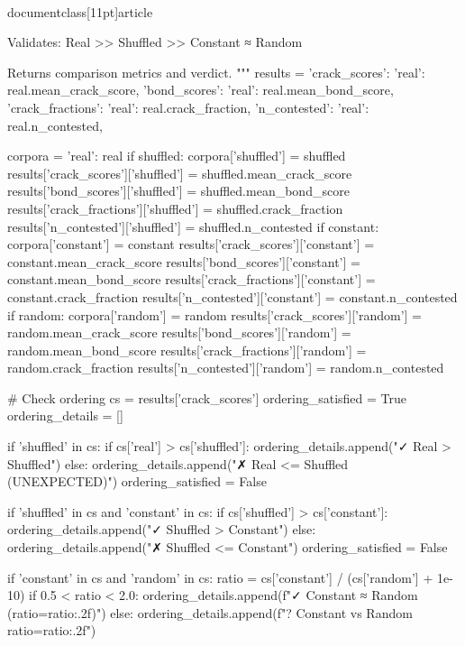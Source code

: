 \\documentclass[11pt]{article}
\begin{document}
\begin{CodeBlock}
{{{{{{{{{{    Validates: Real >> Shuffled >> Constant ≈ Random
    
    Returns comparison metrics and verdict.
    """
    results = {
        'crack_scores': {'real': real.mean_crack_score},
        'bond_scores': {'real': real.mean_bond_score},
        'crack_fractions': {'real': real.crack_fraction},
        'n_contested': {'real': real.n_contested},
    }
    
    corpora = {'real': real}
    if shuffled:
        corpora['shuffled'] = shuffled
        results['crack_scores']['shuffled'] = shuffled.mean_crack_score
        results['bond_scores']['shuffled'] = shuffled.mean_bond_score
        results['crack_fractions']['shuffled'] = shuffled.crack_fraction
        results['n_contested']['shuffled'] = shuffled.n_contested
    if constant:
        corpora['constant'] = constant
        results['crack_scores']['constant'] = constant.mean_crack_score
        results['bond_scores']['constant'] = constant.mean_bond_score
        results['crack_fractions']['constant'] = constant.crack_fraction
        results['n_contested']['constant'] = constant.n_contested
    if random:
        corpora['random'] = random
        results['crack_scores']['random'] = random.mean_crack_score
        results['bond_scores']['random'] = random.mean_bond_score
        results['crack_fractions']['random'] = random.crack_fraction
        results['n_contested']['random'] = random.n_contested
    
    # Check ordering
    cs = results['crack_scores']
    ordering_satisfied = True
    ordering_details = []
    
    if 'shuffled' in cs:
        if cs['real'] > cs['shuffled']:
            ordering_details.append("✓ Real > Shuffled")
        else:
            ordering_details.append("✗ Real <= Shuffled (UNEXPECTED)")
            ordering_satisfied = False
    
    if 'shuffled' in cs and 'constant' in cs:
        if cs['shuffled'] > cs['constant']:
            ordering_details.append("✓ Shuffled > Constant")
        else:
            ordering_details.append("✗ Shuffled <= Constant")
            ordering_satisfied = False
    
    if 'constant' in cs and 'random' in cs:
        ratio = cs['constant'] / (cs['random'] + 1e-10)
        if 0.5 < ratio < 2.0:
            ordering_details.append(f"✓ Constant ≈ Random (ratio={ratio:.2f})")
        else:
            ordering_details.append(f"? Constant vs Random ratio={ratio:.2f}")
    
}}}}}}}}}}
\end{CodeBlock}
\end{document}
